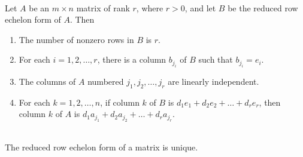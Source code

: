 \begin{theorem}
	\hfill\\
	Let $A$ be an $m \times n$ matrix of rank $r$, where $r > 0$, and let $B$ be the reduced row echelon form of $A$. Then

	\begin{enumerate}
		\item The number of nonzero rows in $B$ is $r$.
		\item For each $i = 1, 2, \dots, r$, there is a column $b_{j_i}$ of $B$ such that $b_{j_i} = e_i$.
		\item The columns of $A$ numbered $j_1, j_2, \dots, j_r$ are linearly independent.
		\item For each $k = 1, 2, \dots, n$, if column $k$ of $B$ is $d_1e_1+d_2e_2+\dots+d_re_r$, then column $k$ of $A$ is $d_1a_{j_1} + d_2a_{j_2} + \dots + d_ra_{j_r}$.
	\end{enumerate}
\end{theorem}

\begin{corollary}
	\hfill\\
	The reduced row echelon form of a matrix is unique.
\end{corollary}
